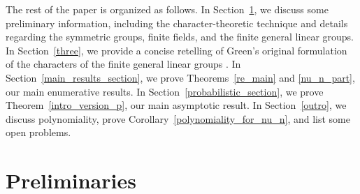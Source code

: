\documentclass[10pt]{article}
\theoremstyle{definition}
\begin{document}
The rest of the paper is organized as follows.
In Section~\ref{two}, we discuss some preliminary information, including the character-theoretic technique and details regarding the symmetric groups, finite fields, and the finite general linear groups.
In Section~\ref{three}, we provide a concise retelling of Green's original formulation of the characters of the finite general linear groups \cite{green}.
In Section~\ref{main_results_section}, we prove Theorems~\ref{re_main} and \ref{nu_n_part}, our main enumerative results.
In Section~\ref{probabilistic_section}, we prove Theorem~\ref{intro_version_p}, our main asymptotic result.
In Section~\ref{outro}, we discuss polynomiality, prove Corollary~\ref{polynomiality_for_nu_n}, and list some open problems.




































\section{Preliminaries}
\label{two}
\end{document}
